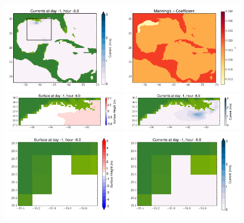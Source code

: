 \documentclass[11pt]{article}
\begin{document}
\includegraphics[width=0.475\textwidth]{frame0042fig2.png}
\vskip 10pt 
\includegraphics[width=0.475\textwidth]{frame0042fig3.png}
\includegraphics[width=0.475\textwidth]{frame0042fig4.png}
\vskip 10pt 
\includegraphics[width=0.475\textwidth]{frame0042fig5.png}
\includegraphics[width=0.475\textwidth]{frame0042fig6.png}
\vskip 10pt 
\includegraphics[width=0.475\textwidth]{frame0042fig7.png}
\end{document}
